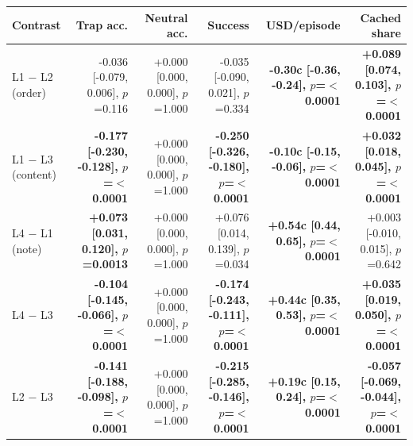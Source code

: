 \begin{tabular}{lrrrrr}
\toprule
\textbf{Contrast} & \textbf{Trap acc.} & \textbf{Neutral acc.} & \textbf{Success} & \textbf{USD/episode} & \textbf{Cached share} \\
\midrule
L1 $-$ L2 (order) & -0.036 [-0.079, 0.006], $p$=0.116 & +0.000 [0.000, 0.000], $p$=1.000 & -0.035 [-0.090, 0.021], $p$=0.334 & \textbf{-0.30c [-0.36, -0.24], $p$=$<$0.0001} & \textbf{+0.089 [0.074, 0.103], $p$=$<$0.0001} \\
L1 $-$ L3 (content) & \textbf{-0.177 [-0.230, -0.128], $p$=$<$0.0001} & +0.000 [0.000, 0.000], $p$=1.000 & \textbf{-0.250 [-0.326, -0.180], $p$=$<$0.0001} & \textbf{-0.10c [-0.15, -0.06], $p$=$<$0.0001} & \textbf{+0.032 [0.018, 0.045], $p$=$<$0.0001} \\
L4 $-$ L1 (note) & \textbf{+0.073 [0.031, 0.120], $p$=0.0013} & +0.000 [0.000, 0.000], $p$=1.000 & +0.076 [0.014, 0.139], $p$=0.034 & \textbf{+0.54c [0.44, 0.65], $p$=$<$0.0001} & +0.003 [-0.010, 0.015], $p$=0.642 \\
L4 $-$ L3 & \textbf{-0.104 [-0.145, -0.066], $p$=$<$0.0001} & +0.000 [0.000, 0.000], $p$=1.000 & \textbf{-0.174 [-0.243, -0.111], $p$=$<$0.0001} & \textbf{+0.44c [0.35, 0.53], $p$=$<$0.0001} & \textbf{+0.035 [0.019, 0.050], $p$=$<$0.0001} \\
L2 $-$ L3 & \textbf{-0.141 [-0.188, -0.098], $p$=$<$0.0001} & +0.000 [0.000, 0.000], $p$=1.000 & \textbf{-0.215 [-0.285, -0.146], $p$=$<$0.0001} & \textbf{+0.19c [0.15, 0.24], $p$=$<$0.0001} & \textbf{-0.057 [-0.069, -0.044], $p$=$<$0.0001} \\
\bottomrule
\end{tabular}
